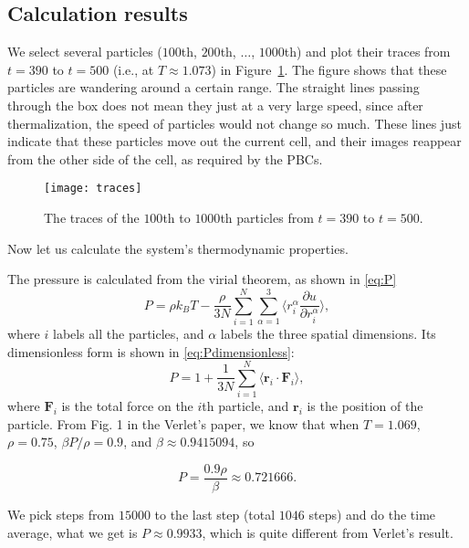 \subsection{Calculation results}

We select several particles ($100$th, $200$th, $\ldots$, $1000$th) and plot their traces
from $t = 390$ to $t = 500$ (i.e., at $T \approx 1.073$) in Figure~\ref{fig:traces}.
The figure shows that these particles are wandering around a certain
range. The straight lines passing through the box does not mean they just at a very
large speed, since after thermalization, the speed of particles would not change so
much. These lines just indicate that these particles move out the current cell,
and their images reappear from the other side of the cell, as required by the PBCs.

\begin{figure}
    \centering
    \texttt{[image: traces]}
    \caption{The traces of the $100$th to $1000$th particles from $t = 390$ to $t = 500$.}
    \label{fig:traces}
\end{figure}

Now let us calculate the  system's thermodynamic properties.

The pressure is calculated from the virial theorem, as shown in \eqref{eq:P}
%
\begin{equation}\label{eq:P}
    P = \rho k_B T - \frac{ \rho }{ 3N } \sum_{i=1}^{N} \sum_{\alpha=1}^{3}
    \biggl \langle r_i^\alpha \frac{ \partial u }{ \partial r_i^\alpha } \biggr \rangle,
\end{equation}
%
where $i$ labels all the particles, and $\alpha$ labels the three spatial dimensions.
Its dimensionless form is shown in \eqref{eq:Pdimensionless}\cite{thijssen_2007}:
%
\begin{equation}\label{eq:Pdimensionless}
    P = 1 + \frac{ 1 }{ 3N } \sum_{i=1}^{N}
    \langle \bm{r}_i \cdot \bm{F}_i \rangle,
\end{equation}
%
where $\bm{F}_i$ is the total force on the $i$th particle, and $\bm{r}_i$ is the
position of the particle.
From Fig. 1 in the Verlet's paper\cite{Verlet}, we know that when $T = 1.069$,
$\rho = 0.75$, $\beta P / \rho = 0.9$, and $\beta \approx 0.9415094$, so

\begin{equation}
    P = \frac{ 0.9 \rho }{ \beta } \approx 0.721666.
\end{equation}

We pick steps from $15000$ to the last step (total $1046$ steps) and do the time average,
what we get is $P \approx 0.9933$, which is quite different from Verlet's result.


